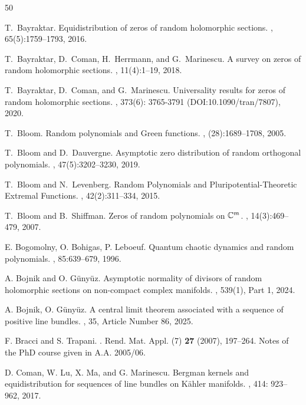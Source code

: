 \documentclass[11pt,leqno,oneside]{amsart}
\numberwithin{equation}{section}
\begin{document}
\begin{thebibliography}{50}

T.~Bayraktar.
\newblock Equidistribution of zeros of random holomorphic sections.
, 65(5):1759--1793, 2016.

T.~Bayraktar, D.~Coman, H.~Herrmann, and G.~Marinescu.
\newblock A survey on zeros of random holomorphic sections.
, 11(4):1--19, 2018.

T.~Bayraktar, D.~Coman, and G.~Marinescu.
\newblock Universality results for zeros of random holomorphic sections.
, 373(6): 3765-3791 (DOI:10.1090/tran/7807), 2020.

T.~Bloom.
\newblock Random polynomials and {G}reen functions.
, (28):1689--1708, 2005.

T.~Bloom and D.~Dauvergne.
\newblock Asymptotic zero distribution of random orthogonal polynomials.
, 47(5):3202--3230, 2019.

T.~Bloom and N.~Levenberg.
\newblock Random {P}olynomials and {P}luripotential-{T}heoretic {E}xtremal {F}unctions.
, 42(2):311--334, 2015.

T.~Bloom and B.~Shiffman.
\newblock Zeros of random polynomials on {$\Bbb C^m$}.
, 14(3):469--479, 2007.

E. Bogomolny, O. Bohigas, P. Leboeuf.
\newblock Quantum chaotic dynamics and random polynomials.
, 85:639--679, 1996.

A. Bojnik and O. G\"{u}ny\"{u}z.
\newblock Asymptotic normality of divisors of random holomorphic sections on non-compact complex manifolds.
, 539(1), Part 1, 2024.

A. Bojnik, O. Günyüz.
\newblock A central limit theorem associated with a sequence of positive line bundles.
, 35, Article Number 86, 2025.

F. Bracci and S. Trapani.
.
\newblock Rend. Mat. Appl. (7) \textbf{27} (2007), 197--264.
\newblock Notes of the PhD course given in A.A. 2005/06.

D. Coman, W. Lu, X. Ma, and G. Marinescu.
\newblock Bergman kernels and equidistribution for sequences of line bundles on K\"{a}hler manifolds.
, 414: 923--962, 2017.


\end{thebibliography}
\end{document}
